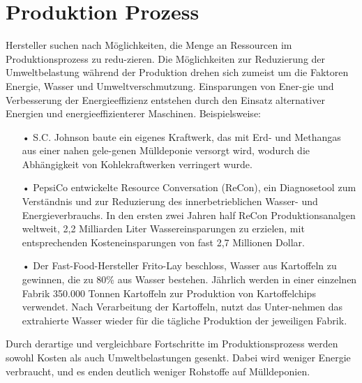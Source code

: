 \documentclass[13pt,titlepage]{article}
\begin{document}
\section*{Produktion Prozess}
Hersteller suchen nach Möglichkeiten, die Menge an Ressourcen im Produktionsprozess zu redu-zieren. Die Möglichkeiten zur Reduzierung der Umweltbelastung während der Produktion drehen sich zumeist um die Faktoren Energie, Wasser und Umweltverschmutzung. Einsparungen von Ener-gie und Verbesserung der Energieeffizienz entstehen durch den Einsatz alternativer Energien und energieeffizienterer Maschinen.  Beispielsweise:
\begin{itemize}
\item[•] S.C. Johnson baute ein eigenes Kraftwerk, das mit Erd- und Methangas aus einer nahen gele-genen Mülldeponie versorgt wird, wodurch die Abhängigkeit von Kohlekraftwerken verringert wurde.
\item[•] PepsiCo entwickelte Resource Conversation (ReCon), ein Diagnosetool zum Verständnis und zur Reduzierung des innerbetrieblichen Wasser- und Energieverbrauchs.  In den ersten zwei Jahren half ReCon Produktionsanalgen weltweit, 2,2 Milliarden Liter Wassereinsparungen zu erzielen, mit entsprechenden Kosteneinsparungen von fast 2,7 Millionen Dollar.
\item[•] Der Fast-Food-Hersteller Frito-Lay beschloss, Wasser aus Kartoffeln zu gewinnen, die zu 80\% aus Wasser bestehen. Jährlich werden in einer einzelnen Fabrik 350.000 Tonnen Kartoffeln zur Produktion von Kartoffelchips verwendet. Nach Verarbeitung der Kartoffeln, nutzt das Unter-nehmen das extrahierte Wasser wieder für die tägliche Produktion der jeweiligen Fabrik.
\end{itemize}

\noindent Durch derartige und vergleichbare Fortschritte im Produktionsprozess werden sowohl Kosten als auch Umweltbelastungen gesenkt. Dabei wird weniger Energie verbraucht, und es enden deutlich weniger Rohstoffe auf Mülldeponien.
\end{document}
